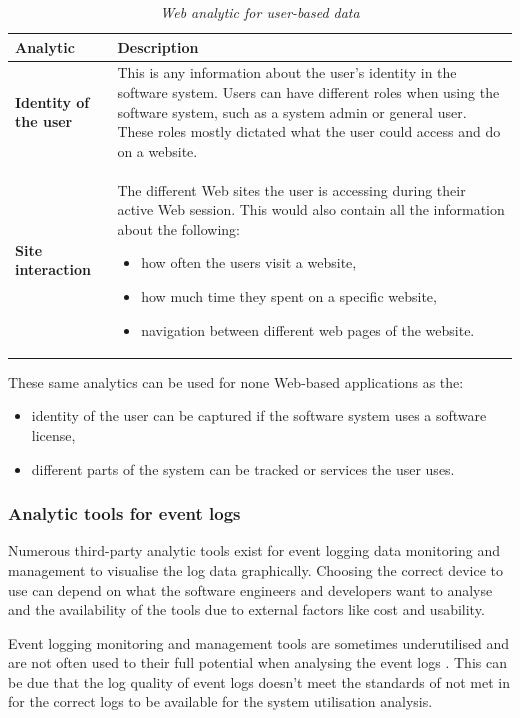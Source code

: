 \begin{table}[!htb]
	\centering
	\caption[Web analytic for user-based data]
	{\textit{Web analytic for user-based data}}
	\label{tbl:ch1_webAnalytics}
	\begin{tabularx}{\textwidth}{|l|X|}
		\hline \textbf{Analytic}  & \textbf{Description} \\
		\hline \textbf{Identity of the user} & This is any information about the user's identity in the software system. Users can have different roles when using the software system, such as a system admin or general user. These roles mostly dictated what the user could access and do on a website. \\
		\hline \textbf{Site interaction} & The different Web sites the user is accessing during their active Web session. This would also contain all the information about the following: 
		\begin{itemize}
			\item how often the users visit a website,
			\item how much time they spent on a specific website,
			\item navigation between different web pages of the website.
		\end{itemize}
		\\
		\hline
	\end{tabularx}
\end{table}

These same analytics can be used for none Web-based applications as the: 
\begin{itemize}
	\item identity of the user can be captured if the software system uses a software license,
	\item different parts of the system can be tracked or services the user uses.
\end{itemize} 

\subsubsection{Analytic tools for event logs}
Numerous third-party analytic tools exist for event logging data monitoring and management to visualise the log data graphically. Choosing the correct device to use can depend on what the software engineers and developers want to analyse and the availability of the tools due to external factors like cost and usability. \par Event logging monitoring and management tools are sometimes underutilised and are not often used to their full potential when analysing the event logs \cite{Fedaghi2010}. This can be due that the log quality of event logs doesn't meet the standards of  not met in  for the correct logs to be available for the system utilisation analysis. 

